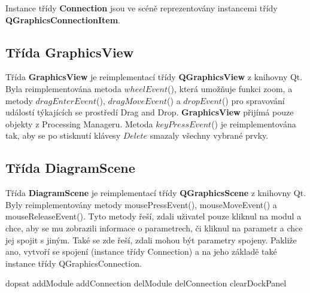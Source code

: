 Instance třídy \textbf{Connection} jsou ve scéně reprezentovány instancemi třídy \textbf{QGraphicsConnectionItem}.

\subsection*{Třída GraphicsView}
Třída \textbf{GraphicsView} je reimplementací třídy \textbf{QGraphicsView} z knihovny Qt. Byla reimplementována metoda $wheelEvent$(), která umožňuje funkci zoom, a  metody $dragEnterEvent$(), $dragMoveEvent$() a $dropEvent$() pro spravování událostí týkajících se prostředí Drag and Drop. \textbf{GraphicsView} přijímá pouze objekty z Processing Manageru. Metoda $keyPressEvent$() je reimplementována tak, aby se po stisknutí klávesy $Delete$ smazaly všechny vybrané prvky. 


\subsection*{Třída DiagramScene}
Třída \textbf{DiagramScene} je reimplementací třídy \textbf{QGraphicsScene} z knihovny Qt. Byly reimplementovány metody mousePressEvent(), mouseMoveEvent() a mouseReleaseEvent(). Tyto metody řeší, zdali uživatel pouze kliknul na modul a chce, aby se mu zobrazili informace o parametrech, či kliknul na parametr a chce jej spojit s jiným. Také se zde řeší, zdali mohou být parametry spojeny. Pakliže ano, vytvoří se spojení (instance třídy Connection) a na jeho základě také instance třídy QGraphicsConnection.

dopsat
addModule
addConnection
delModule
delConnection
clearDockPanel
